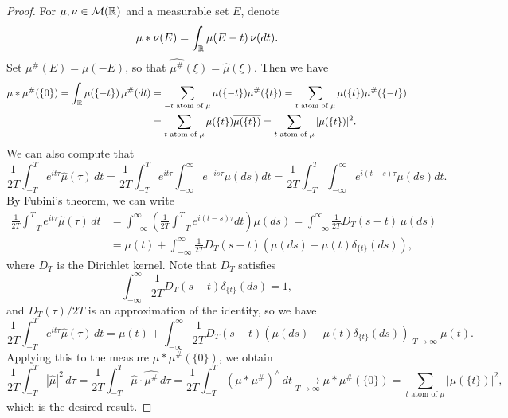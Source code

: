 \begin{proof}
  For $\mu, \nu \in \mathcal{M}(\mathbb{R})$ and
  a measurable set $E$, denote
  \[
    \mu * \nu(E)
    = \int_{\mathbb{R}} \mu(E - t)\, \nu(dt).
  \]
  Set $\mu^\#(E) = \overline{\mu(-E)}$, so that
  $\widehat{\mu^\#}(\xi) = \overline{\widehat{\mu}(\xi)}$.
  Then we have
  \begin{align*}
    \mu * \mu^\#(\{0\})
    = \int_{\mathbb{R}} \mu(\{-t\})\, \mu^\#(dt)
    &= \sum_{\text{$-t$ atom of $\mu$}}
    \mu(\{-t\}) \mu^\#(\{t\})
    = \sum_{\text{$t$ atom of $\mu$}}
    \mu(\{t\}) \mu^\#(\{-t\}) \\
    &= \sum_{\text{$t$ atom of $\mu$}}
    \mu(\{t\}) \overline{\mu(\{t\})}
    = \sum_{\text{$t$ atom of $\mu$}}
    |\mu(\{t\})|^2.
  \end{align*}
  We can also compute that
  \[
    \frac{1}{2T} \int_{-T}^T e^{it\tau} \widehat{\mu}(\tau)\, dt
    = \frac{1}{2T} \int_{-T}^T e^{it\tau} \int_{-\infty}^\infty e^{-is\tau} \mu(ds) dt
    = \frac{1}{2T} \int_{-T}^T \int_{-\infty}^\infty e^{i(t - s)\tau} \mu(ds) dt.
  \]
  By Fubini's theorem, we can write
  \begin{align*}
    \frac{1}{2T} \int_{-T}^T e^{it\tau} \widehat{\mu}(\tau)\, dt
    &= \int_{-\infty}^\infty \left(\frac{1}{2T} \int_{-T}^T e^{i(t - s)\tau} dt \right) \mu(ds)
    = \int_{-\infty}^\infty \frac{1}{2T} D_T(s - t)\, \mu(ds) \\
    &= \mu(t) + \int_{-\infty}^\infty \frac{1}{2T} D_T(s - t) \left(\mu(ds) - \mu(t) \delta_{\{t\}}(ds)\right),
  \end{align*}
  where $D_T$ is the Dirichlet kernel. Note
  that $D_T$ satisfies
  \[
    \int_{-\infty}^\infty \frac{1}{2T} D_T(s - t) \delta_{\{t\}}(ds) = 1,
  \]
  and $D_T(\tau) / 2T$ is an approximation
  of the identity, so we have
  \[
    \frac{1}{2T} \int_{-T}^T e^{it\tau} \widehat{\mu}(\tau)\, dt
    = \mu(t) + \int_{-\infty}^\infty \frac{1}{2T} D_T(s - t) \left(\mu(ds) - \mu(t) \delta_{\{t\}}(ds)\right)
    \xrightarrow[T \to \infty]{} \mu(t).
  \]
  Applying this to the measure
  $\mu * \mu^\#(\{0\})$, we obtain
  \[
    \frac{1}{2T} \int_{-T}^T |\widehat{\mu}|^2\, d\tau
    =
    \frac{1}{2T} \int_{-T}^T \widehat{\mu} \cdot \widehat{\mu^\#}\, d\tau
    = \frac{1}{2T} \int_{-T}^T (\mu * \mu^\#)^{\wedge}\, dt
    \xrightarrow[T \to \infty]{} \mu * \mu^\#(\{0\})
    = \sum_{\text{$t$ atom of $\mu$}}
    |\mu(\{t\})|^2,
  \]
  which is the desired result.
\end{proof}

